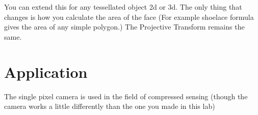 You can extend this for any tessellated object 2d or 3d. The only thing that changes is how you calculate the area of the face (For example shoelace formula gives the area of any simple polygon.) The Projective Transform remains the same. 

\section*{Application}
The single pixel camera is used in the field of compressed sensing (though the camera works a little differently than the one you made in this lab)
